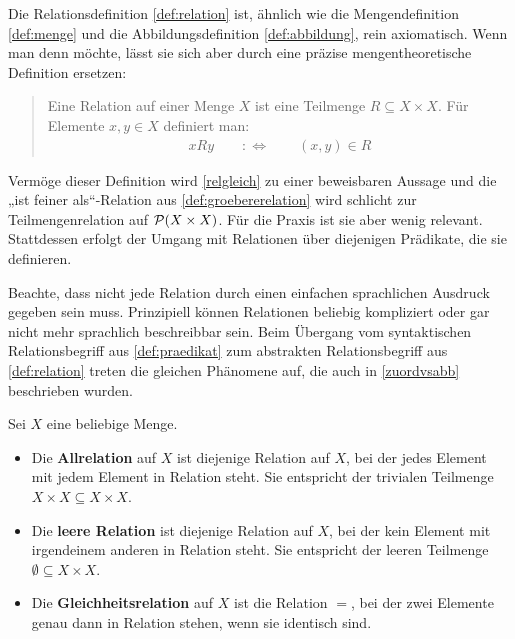 \begin{vorschau}
    Die Relationsdefinition \cref{def:relation} ist, ähnlich wie die Mengendefinition \cref{def:menge} und die Abbildungsdefinition \cref{def:abbildung}, rein axiomatisch. Wenn man denn möchte, lässt sie sich aber durch eine präzise mengentheoretische Definition ersetzen:
    \begin{quote}
        Eine Relation auf einer Menge $X$ ist eine Teilmenge $R\subseteq X\times X$. Für Elemente $x,y\in X$ definiert man:
        \begin{align*}
            xRy\qquad:\Leftrightarrow\qquad (x,y) \in R
        \end{align*}
    \end{quote}
    Vermöge dieser Definition wird \cref{relgleich} zu einer beweisbaren Aussage und die „ist feiner als“-Relation aus \cref{def:groebererelation} wird schlicht zur Teilmengenrelation auf $\mathcal P(X\times X)$. Für die Praxis ist sie aber wenig relevant. Stattdessen erfolgt der Umgang mit Relationen über diejenigen Prädikate, die sie definieren.
    
    Beachte, dass nicht jede Relation durch einen einfachen sprachlichen Ausdruck gegeben sein muss. Prinzipiell können Relationen beliebig kompliziert oder gar nicht mehr sprachlich beschreibbar sein. Beim Übergang vom syntaktischen Relationsbegriff aus \cref{def:praedikat} zum abstrakten Relationsbegriff aus \cref{def:relation} treten die gleichen Phänomene auf, die auch in \cref{zuordvsabb} beschrieben wurden.
\end{vorschau}


\begin{bsp} \label{def:universellerelationen}  
    Sei $X$ eine beliebige Menge.
    \begin{itemize}
        \item Die \textbf{Allrelation} auf $X$ ist diejenige Relation auf $X$, bei der jedes Element mit jedem Element in Relation steht. Sie entspricht der trivialen Teilmenge $X\times X\subseteq X\times X$.
        \item Die \textbf{leere Relation} ist diejenige Relation auf $X$, bei der kein Element mit irgendeinem anderen in Relation steht. Sie entspricht der leeren Teilmenge $\emptyset\subseteq X\times X$.
        \item Die \textbf{Gleichheitsrelation} auf $X$ ist die Relation $=$, bei der zwei Elemente genau dann in Relation stehen, wenn sie identisch sind.
    \end{itemize}
\end{bsp}


